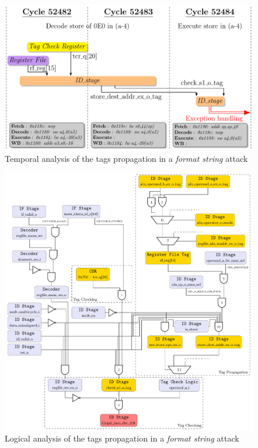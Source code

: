 \begin{frame}
    \begin{figure}
        \centering
        \includegraphics[height=.85\textheight]{src/2_vuln_assessment/img/wuftpd/ftpd_short.pdf}
        \caption{Temporal analysis of the tags propagation in a \textit{format string} attack}
        \label{fig:analyseTempoFormatString}
    \end{figure}
\end{frame}

\begin{frame}
    \begin{figure}
        \centering
        \includegraphics[height=.85\textheight]{src/2_vuln_assessment/img/wuftpd/arborescence_wuftpd.pdf}
        \caption{Logical analysis of the tags propagation in a \textit{format string} attack}
        \label{fig:analyseLogiqueFormatString}
    \end{figure}
\end{frame}
